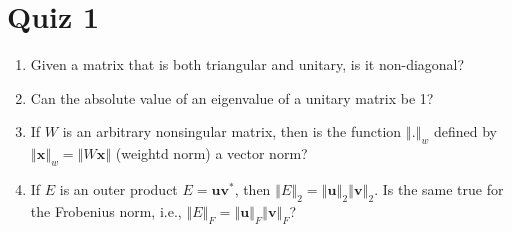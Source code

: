 \section*{Quiz 1}\label{sec:quiz-1}
\begin{enumerate}
\item Given a matrix that is both triangular and unitary, is it non-diagonal?
\item Can the absolute value of an eigenvalue of a unitary matrix be 1?
\item If \(W\) is an arbitrary nonsingular matrix, then is the function \(\left\Vert.\right\Vert_w\) defined by \(\left\Vert\mathbf{x}\right\Vert_w=\left\Vert W\mathbf{x}\right\Vert\) (weightd norm) a vector norm?
\item If \(E\) is an outer product \(E=\mathbf{u}\mathbf{v}^*\), then \(\left\Vert E \right\Vert_2 = \left\Vert \mathbf{u} \right\Vert_2 \left\Vert \mathbf{v} \right\Vert_2\). Is the same true for the Frobenius norm, i.e., \(\left\Vert E \right\Vert_F=\left\Vert \mathbf{u} \right\Vert_F \left\Vert \mathbf{v} \right\Vert_F\)?
\end{enumerate}
